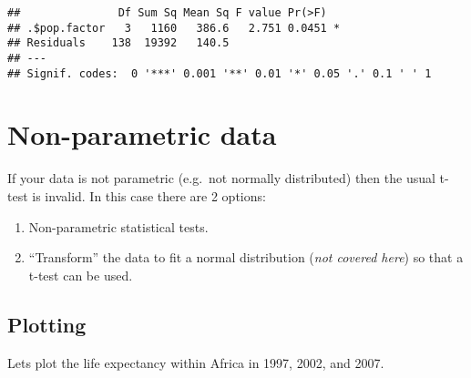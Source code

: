 \documentclass[]{book}
\makeatletter
\newenvironment{Shaded}{\begin{snugshade}}{\end{snugshade}}
\newcommand{\KeywordTok}[1]{\textcolor[rgb]{0.13,0.29,0.53}{\textbf{#1}}}
\newcommand{\DataTypeTok}[1]{\textcolor[rgb]{0.13,0.29,0.53}{#1}}
\newcommand{\DecValTok}[1]{\textcolor[rgb]{0.00,0.00,0.81}{#1}}
\newcommand{\StringTok}[1]{\textcolor[rgb]{0.31,0.60,0.02}{#1}}
\newcommand{\CommentTok}[1]{\textcolor[rgb]{0.56,0.35,0.01}{\textit{#1}}}
\newcommand{\OtherTok}[1]{\textcolor[rgb]{0.56,0.35,0.01}{#1}}
\newcommand{\OperatorTok}[1]{\textcolor[rgb]{0.81,0.36,0.00}{\textbf{#1}}}
\newcommand{\NormalTok}[1]{#1}
\newenvironment{kframe}{%
\medskip{}
\setlength{\fboxsep}{.8em}
 \def\at@end@of@kframe{}%
 \ifinner\ifhmode%
  \def\at@end@of@kframe{\end{minipage}}%
  \begin{minipage}{\columnwidth}%
 \fi\fi%
 \def\FrameCommand##1{\hskip\@totalleftmargin \hskip-\fboxsep
 \colorbox{shadecolor}{##1}\hskip-\fboxsep
     \hskip-\linewidth \hskip-\@totalleftmargin \hskip\columnwidth}%
 \MakeFramed {\advance\hsize-\width
   \@totalleftmargin\z@ \linewidth\hsize
   \@setminipage}}%
 {\par\unskip\endMakeFramed%
 \at@end@of@kframe}
\renewenvironment{Shaded}{\begin{kframe}}{\end{kframe}}
\theoremstyle{definition}
\theoremstyle{definition}
\theoremstyle{definition}
\theoremstyle{remark}
\makeatother
\begin{document}
\begin{verbatim}
##               Df Sum Sq Mean Sq F value Pr(>F)  
## .$pop.factor   3   1160   386.6   2.751 0.0451 *
## Residuals    138  19392   140.5                 
## ---
## Signif. codes:  0 '***' 0.001 '**' 0.01 '*' 0.05 '.' 0.1 ' ' 1
\end{verbatim}

\section{Non-parametric data}\label{non-parametric-data}

If your data is not parametric (e.g.~not normally distributed) then the
usual t-test is invalid. In this case there are 2 options:

\begin{enumerate}
\def\labelenumi{\arabic{enumi}.}
\item
  Non-parametric statistical tests.
\item
  ``Transform'' the data to fit a normal distribution (\emph{not covered
  here}) so that a t-test can be used.
\end{enumerate}

\subsection{Plotting}\label{plotting-2}

Lets plot the life expectancy within Africa in 1997, 2002, and 2007.

\begin{Shaded}
\end{Shaded}
\end{document}
